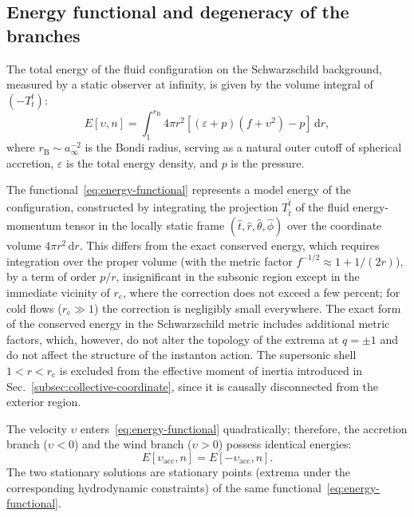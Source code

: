 \documentclass[12pt,a4paper,preprint]{elsarticle}
\begin{document}
        \subsection{Energy functional and degeneracy of the branches}\label{subsec:energy-functional}
            The total energy of the fluid configuration on the Schwarzschild background, measured by a static observer at infinity, is given by the volume integral of $(-T^{t}_{t})$:
            \begin{equation}
                E[\upsilon, n] = \int_{1}^{r_{\mathrm{B}}} 4\pi r^{2}\left[(\varepsilon + p)(f + \upsilon^{2}) - p\right]\,\mathrm{d}r,
                \label{eq:energy-functional}
            \end{equation}
            where $r_{\mathrm{B}} \sim a_{\infty}^{-2}$ is the Bondi radius, serving as a natural outer cutoff of spherical accretion, $\varepsilon$ is the total energy density, and $p$ is the pressure.

            The functional~\eqref{eq:energy-functional} represents a model energy of the configuration, constructed by integrating the projection $T^{\hat{t}}_{\hat{t}}$ of the fluid energy-momentum tensor in the locally static frame $(\hat{t}, \hat{r}, \hat{\theta}, \hat{\phi})$ over the coordinate volume $4\pi r^{2}\,\mathrm{d}r$. This differs from the exact conserved energy, which requires integration over the proper volume (with the metric factor $f^{-1/2} \approx 1 + 1/(2r)$), by a term of order $p/r$, insignificant in the subsonic region except in the immediate vicinity of $r_{\mathrm{c}}$, where the correction does not exceed a few percent; for cold flows ($r_{\mathrm{c}} \gg 1$) the correction is negligibly small everywhere. The exact form of the conserved energy in the Schwarzschild metric includes additional metric factors, which, however, do not alter the topology of the extrema at $q = \pm 1$ and do not affect the structure of the instanton action. The supersonic shell $1 < r < r_{\mathrm{c}}$ is excluded from the effective moment of inertia introduced in Sec.~\ref{subsec:collective-coordinate}, since it is causally disconnected from the exterior region.

            The velocity $\upsilon$ enters~\eqref{eq:energy-functional} quadratically; therefore, the accretion branch ($\upsilon < 0$) and the wind branch ($\upsilon > 0$) possess identical energies:
            \begin{equation}
                E[\upsilon_{\mathrm{acc}}, n] = E[-\upsilon_{\mathrm{acc}}, n].
                \label{eq:energy-degeneracy}
            \end{equation}
            The two stationary solutions are stationary points (extrema under the corresponding hydrodynamic constraints) of the same functional~\eqref{eq:energy-functional}.
            
\end{document}
